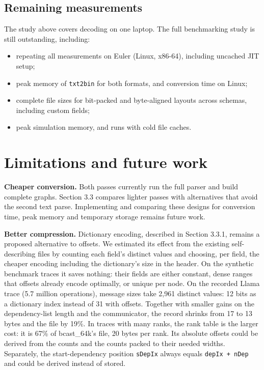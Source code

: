 \documentclass[10pt,a4paper]{article}
\begin{document}
\hypertarget{remaining-measurements}{}
\subsection{Remaining measurements}

The study above covers decoding on one laptop. The full benchmarking study is still outstanding, including:

\begin{itemize}
\item repeating all measurements on Euler (Linux, x86-64), including uncached JIT setup;
\item peak memory of \texttt{txt2bin} for both formats, and conversion time on Linux;
\item complete file sizes for bit-packed and byte-aligned layouts across schemas, including custom fields;
\item peak simulation memory, and runs with cold file caches.
\end{itemize}

\hypertarget{limitations-and-future-work}{}
\section{Limitations and future work}

\textbf{Cheaper conversion.} Both passes currently run the full parser and build complete graphs. Section 3.3 compares lighter passes with alternatives that avoid the second text parse. Implementing and comparing these designs for conversion time, peak memory and temporary storage remains future work.

\textbf{Better compression.} Dictionary encoding, described in Section 3.3.1, remains a proposed alternative to offsets. We estimated its effect from the existing self-describing files by counting each field's distinct values and choosing, per field, the cheaper encoding including the dictionary's size in the header. On the synthetic benchmark traces it saves nothing: their fields are either constant, dense ranges that offsets already encode optimally, or unique per node. On the recorded Llama trace (5.7 million operations), message sizes take 2,961 distinct values: 12 bits as a dictionary index instead of 31 with offsets. Together with smaller gains on the dependency-list length and the communicator, the record shrinks from 17 to 13 bytes and the file by 19\%. In traces with many ranks, the rank table is the larger cost: it is 67\% of bcast\_64k's file, 20 bytes per rank. Its absolute offsets could be derived from the counts and the counts packed to their needed widths. Separately, the start-dependency position \texttt{sDepIx} always equals \texttt{depIx + nDep\allowbreak{}} and could be derived instead of stored.
\end{document}
